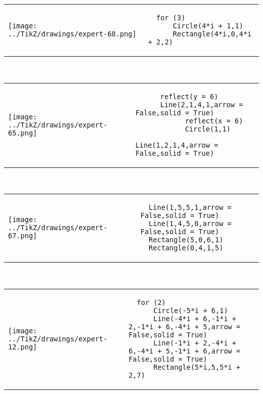         \begin{tabular}{ll}
\texttt{[image: ../TikZ/drawings/expert-68.png]}&
        \begin{minipage}{10cm}
        \begin{verbatim}
  for (3)
      Circle(4*i + 1,1)
      Rectangle(4*i,0,4*i + 2,2)
        \end{verbatim}
\end{minipage}
\end{tabular}        
        \\

        \begin{tabular}{ll}
\texttt{[image: ../TikZ/drawings/expert-65.png]}&
        \begin{minipage}{10cm}
        \begin{verbatim}
      reflect(y = 6)
      Line(2,1,4,1,arrow = False,solid = True)
            reflect(x = 6)
            Circle(1,1)
            Line(1,2,1,4,arrow = False,solid = True)
        \end{verbatim}
\end{minipage}
\end{tabular}        
        \\

        \begin{tabular}{ll}
\texttt{[image: ../TikZ/drawings/expert-67.png]}&
        \begin{minipage}{10cm}
        \begin{verbatim}
  Line(1,5,5,1,arrow = False,solid = True)
  Line(1,4,5,0,arrow = False,solid = True)
  Rectangle(5,0,6,1)
  Rectangle(0,4,1,5)
        \end{verbatim}
\end{minipage}
\end{tabular}        
        \\

        \begin{tabular}{ll}
\texttt{[image: ../TikZ/drawings/expert-12.png]}&
        \begin{minipage}{10cm}
        \begin{verbatim}
  for (2)
      Circle(-5*i + 6,1)
      Line(-4*i + 6,-1*i + 2,-1*i + 6,-4*i + 5,arrow = False,solid = True)
      Line(-1*i + 2,-4*i + 6,-4*i + 5,-1*i + 6,arrow = False,solid = True)
      Rectangle(5*i,5,5*i + 2,7)
        \end{verbatim}
\end{minipage}
\end{tabular}        
        \\

